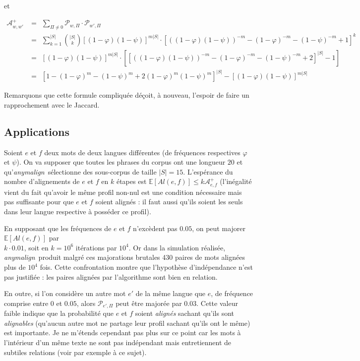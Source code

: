 \documentclass[a4paper,10pt]{article}
\newcommand{\anym}{\emph{anymalign}}
\begin{document}
et

\begin{align*}
\mathcal{A}^{+}_{w,w'} & =~~ \sum_{\Pi\neq 0}\mathcal{P}_{w,\Pi}\cdot\mathcal{P}_{w',\Pi} \\
					& =~~ \sum_{k=1}^{|S|}\binom{|S|}{k} [(1-\varphi)(1-\psi)]^{m|S|}\cdot[((1-\varphi)(1-\psi))^{-m}-(1-\varphi)^{-m}-(1-\psi)^{-m}+1]^k \\
					& =~~ [(1-\varphi)(1-\psi)]^{m|S|}\cdot[[((1-\varphi)(1-\psi))^{-m}-(1-\varphi)^{-m}-(1-\psi)^{-m}+2]^{|S|}-1] \\
					& =~~ [1-(1-\varphi)^m-(1-\psi)^m+2(1-\varphi)^m(1-\psi)^m]^{|S|} - [(1-\varphi)(1-\psi)]^{m|S|}
\end{align*}

Remarquons que cette formule compliquée déçoit, à nouveau, l'espoir de faire un rapprochement avec le Jaccard.



\subsection{Applications}

Soient $e$ et $f$ deux mots de deux langues différentes (de fréquences respectives $\varphi$ et $\psi$). On va supposer que toutes les phrases du corpus ont une longueur $20$ et qu'\anym~sélectionne des sous-corpus de taille $|S|=15$. L'espérance du nombre d'alignements de $e$ et $f$ en $k$ étapes est $\mathbb{E}[Al(e,f)] \leq k\mathcal{A}^{+}_{e,f}$ (l'inégalité vient du fait qu'avoir le même profil non-nul est une condition nécessaire mais pas suffisante pour que $e$ et $f$ soient alignés : il faut aussi qu'ils soient les seuls dans leur langue respective à posséder ce profil).

En supposant que les fréquences de $e$ et $f$ n'excèdent pas $0.05$, on peut majorer $\mathbb{E}[Al(e,f)]$ par \\$k\cdot0.01$, soit en $k=10^6$ itérations par $10^4$. Or dans la simulation réalisée, \anym~produit malgré ces majorations brutales 430 paires de mots alignées plus de $10^4$ fois. Cette confrontation montre que l'hypothèse d'indépendance n'est pas justifiée : les paires alignées par l'algorithme sont bien en relation.

En outre, si l'on considère un autre mot $e'$ de la même langue que $e$, de fréquence comprise entre $0$ et $0.05$, alors $\mathcal{P}_{e',\Pi}$ peut être majorée par $0.03$. Cette valeur faible indique que la probabilité que $e$ et $f$ soient \emph{alignés} sachant qu'ils sont \emph{alignables} (qu'aucun autre mot ne partage leur profil sachant qu'ils ont le même) est importante. Je ne m'étends cependant pas plus sur ce point car les mots à l'intérieur d'un même texte ne sont pas indépendant mais entretiennent de subtiles relations (voir par exemple \cite{pecina2006combining} à ce sujet).
\end{document}
